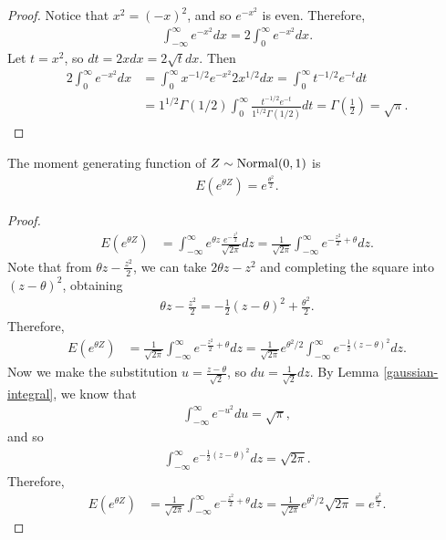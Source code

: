 \begin{proof}
    Notice that $x^2 = (-x)^2$, and so $e^{-x^2}$ is even. Therefore,
    \begin{align*}
        \int_{-\infty}^{\infty}e^{-x^2}dx = 2\int_{0}^{\infty}e^{-x^2}dx.
    \end{align*}
    Let $t = x^2$, so $dt = 2xdx = 2\sqrt{t}dx$. Then
    \begin{align*}
        2\int_{0}^{\infty}e^{-x^2}dx &= \int_{0}^{\infty}x^{-1/2}e^{-x^2}2x^{1/2}dx = \int_{0}^{\infty}t^{-1/2}e^{-t}dt \\
        &= 1^{1/2}\Gamma(1/2)\int_{0}^{\infty}\frac{t^{-1/2}e^{-t}}{1^{1/2}\Gamma(1/2)}dt = \Gamma\left(\frac{1}{2}\right) = \sqrt{\pi}.
    \end{align*}
\end{proof}

\begin{thm}
    The moment generating function of $Z \sim \mathrm{Normal}(0, 1)$ is
    \begin{align*}
        E\left(e^{\theta Z}\right) = e^{\frac{\theta^2}{2}}.
    \end{align*}
\end{thm}

\begin{proof}
    \begin{align*}
        E\left(e^{\theta Z}\right) &= \int_{-\infty}^{\infty}e^{\theta z}\frac{e^{-\frac{z^2}{2}}}{\sqrt{2\pi}}dz = \frac{1}{\sqrt{2\pi}}\int_{-\infty}^{\infty}e^{-\frac{z^2}{2}+\theta}dz.
    \end{align*}
    Note that from $\theta z - \frac{z^2}{2}$, we can take $2\theta z - z^2$ and completing the square into $(z - \theta)^2$, obtaining
    \begin{align*}
        \theta z - \frac{z^2}{2} = -\frac{1}{2}\left(z - \theta\right)^2 + \frac{\theta^2}{2}.
    \end{align*}
    Therefore,
    \begin{align*}
        E\left(e^{\theta Z}\right) &= \frac{1}{\sqrt{2\pi}}\int_{-\infty}^{\infty}e^{-\frac{z^2}{2}+\theta}dz = \frac{1}{\sqrt{2\pi}}e^{\theta^2/2}\int_{-\infty}^{\infty}e^{-\frac{1}{2}\left(z - \theta\right)^2}dz.
    \end{align*}
    Now we make the substitution $u = \frac{z - \theta}{\sqrt{2}}$, so $du = \frac{1}{\sqrt{2}}dz$. By Lemma \ref{gaussian-integral}, we know that
    \begin{align*}
        \int_{-\infty}^{\infty}e^{-u^2}du = \sqrt{\pi},
    \end{align*}
    and so
    \begin{align*}
        \int_{-\infty}^{\infty}e^{-\frac{1}{2}\left(z - \theta\right)^2}dz = \sqrt{2\pi}.
    \end{align*}
    Therefore,
    \begin{align*}
        E\left(e^{\theta Z}\right) &= \frac{1}{\sqrt{2\pi}}\int_{-\infty}^{\infty}e^{-\frac{z^2}{2}+\theta}dz = \frac{1}{\sqrt{2\pi}}e^{\theta^2/2}\sqrt{2\pi} = e^{\frac{\theta^2}{2}}.
    \end{align*}
\end{proof}

